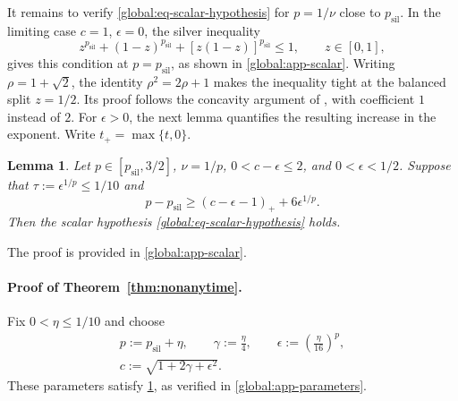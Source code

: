 \documentclass[11pt,letterpaper]{article}
\newtheorem{lemma}[lemma]{Lemma}
\theoremstyle{definition}
\newcommand{\psil}{p_{\mathrm{sil}}}
\begin{document}
It remains to verify \eqref{global:eq-scalar-hypothesis} for $p=1/\nu$ close to $\psil$.
In the limiting case $c=1$, $\epsilon=0$, the silver inequality
\begin{equation}
  z^{\psil}+(1-z)^{\psil}+[z(1-z)]^{\psil}\le1,
  \qquad z\in[0,1],
  \label{global:eq-silver-inequality}
\end{equation}
gives this condition at $p=\psil$, as shown in \cref{global:app-scalar}.
Writing $\rho=1+\sqrt2$, the identity $\rho^2=2\rho+1$ makes the inequality tight at the balanced split $z=1/2$.
Its proof follows the concavity argument of \citet[Lemma~C.4]{JungChoYun2026}, with coefficient $1$ instead of $2$.
For $\epsilon>0$, the next lemma quantifies the resulting increase in the exponent.
Write $t_+=\max\{t,0\}$.

\begin{lemma}
\label{global:lem-scalar-condition}
Let \(p\in[\psil,3/2]\), \(\nu=1/p\), \(0<c-\epsilon\le2\), and \(0<\epsilon<1/2\).
Suppose that \(\tau:=\epsilon^{1/p}\le1/10\) and
\begin{equation}
\label{global:eq-scalar-sufficient}
 p-\psil\ge(c-\epsilon-1)_++6\epsilon^{1/p}.
\end{equation}
Then the scalar hypothesis \eqref{global:eq-scalar-hypothesis} holds.
\end{lemma}

The proof is provided in \cref{global:app-scalar}.

\paragraph{Proof of Theorem~\ref{thm:nonanytime}.}
\pushQED{\qed}
Fix $0<\eta\le1/10$ and choose
\begin{equation}
\label{global:eq-parameter-choice}
 \begin{gathered}
 p:=\psil+\eta,\qquad \gamma:=\frac{\eta}{4},\qquad \epsilon:=\left(\frac{\eta}{16}\right)^p,\\
 c:=\sqrt{1+2\gamma+\epsilon^2}.
 \end{gathered}
\end{equation}
These parameters satisfy \cref{global:lem-scalar-condition}, as verified in \cref{global:app-parameters}.
\end{document}
